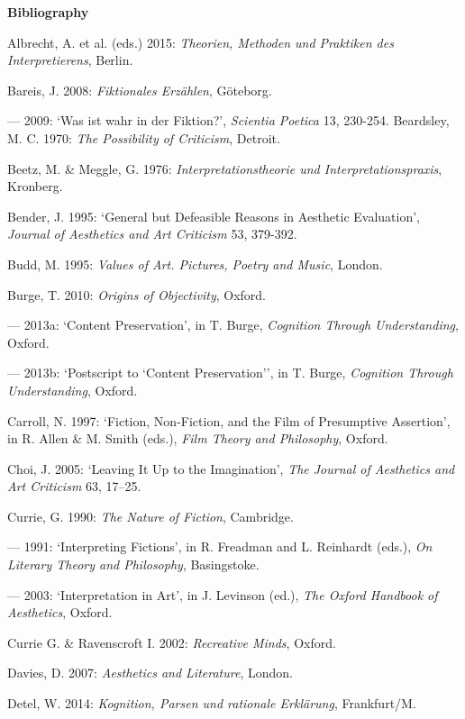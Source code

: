 \vspace{.6cm}
\noindent\textbf{\large Bibliography}
\vspace{.2cm}

\begin{hangparas}{.5cm}{1}

Albrecht, A. et al. (eds.) 2015: \emph{Theorien, Methoden und Praktiken des Interpretierens}, Berlin.

Bareis, J. 2008: \emph{Fiktionales Erz\"ahlen}, G\"oteborg.

--- 2009: `Was ist wahr in der Fiktion?', \emph{Scientia Poetica} 13, 230-254. 
Beardsley, M. C. 1970: \emph{The Possibility of Criticism}, Detroit.

Beetz, M. \& Meggle, G. 1976: \emph{Interpretationstheorie und Interpretationspraxis}, Kronberg.

Bender, J. 1995: `General but Defeasible Reasons in Aesthetic Evaluation', \emph{Journal of Aesthetics and Art Criticism} 53, 379-392.

Budd, M. 1995: \emph{Values of Art. Pictures, Poetry and Music}, London. 

Burge, T. 2010: \emph{Origins of Objectivity}, Oxford.

--- 2013a: `Content Preservation', in T. Burge, \emph{Cognition Through Understanding}, Oxford.

--- 2013b: `Postscript to `Content Preservation'', in T. Burge, \emph{Cognition Through Understanding}, Oxford.

Carroll, N. 1997: `Fiction, Non-Fiction, and the Film of Presumptive Assertion', in R. Allen \& M. Smith (eds.), \emph{Film Theory and Philosophy}, Oxford.

Choi, J. 2005: `Leaving It Up to the Imagination', \emph{The Journal of Aesthetics and Art Criticism} 63, 17--25. 

Currie, G. 1990: \emph{The Nature of Fiction}, Cambridge. 

--- 1991: `Interpreting Fictions', in R. Freadman and L. Reinhardt (eds.), \emph{On Literary Theory and Philosophy}, Basingstoke. 

--- 2003: `Interpretation in Art', in J. Levinson (ed.), \emph{The Oxford Handbook of Aesthetics}, Oxford.

Currie G. \& Ravenscroft I. 2002: \emph{Recreative Minds}, Oxford.

Davies, D. 2007: \emph{Aesthetics and Literature}, London.

Detel, W. 2014: \emph{Kognition, Parsen und rationale Erkl\"arung}, Frankfurt/M.


\end{hangparas}
